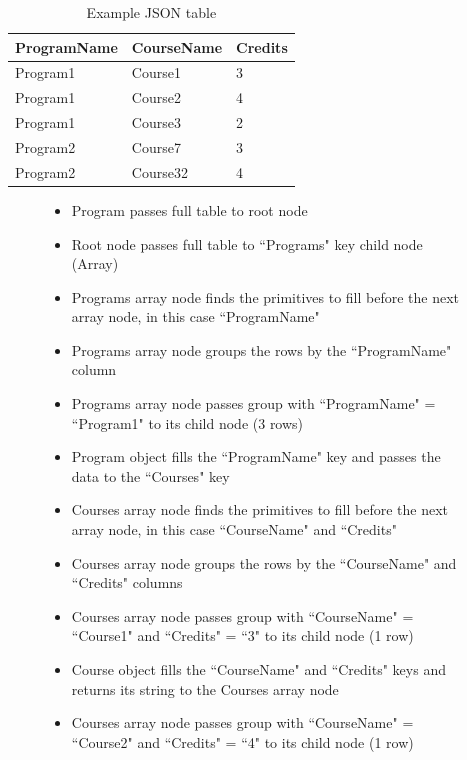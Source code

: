 \begin{table}[]
    \begin{tabular}{|lll|}
    \hline
    ProgramName & CourseName & Credits \\ \hline
    Program1    & Course1    & 3       \\
    Program1    & Course2    & 4       \\
    Program1    & Course3    & 2       \\
    Program2    & Course7    & 3       \\
    Program2    & Course32   & 4       \\ \hline
    \end{tabular}
    \caption{Example JSON table}
    \label{table:json_table}
\end{table}

\begin{figure}[]
    \begin{mdframed}
        \begin{itemize}
            \item Program passes full table to root node
            \item Root node passes full table to ``Programs" key child node (Array)
            \item Programs array node finds the primitives to fill before the next array node, in this case ``ProgramName"
            \item Programs array node groups the rows by the ``ProgramName" column
            \item Programs array node passes group with ``ProgramName" = ``Program1" to its child node (3 rows)
            \item Program object fills the ``ProgramName" key and passes the data to the ``Courses" key
            \item Courses array node finds the primitives to fill before the next array node, in this case ``CourseName" and ``Credits"
            \item Courses array node groups the rows by the ``CourseName" and ``Credits" columns
            \item Courses array node passes group with ``CourseName" = ``Course1" and ``Credits" = ``3" to its child node (1 row)
            \item Course object fills the ``CourseName" and ``Credits" keys and returns its string to the Courses array node
            \item Courses array node passes group with ``CourseName" = ``Course2" and ``Credits" = ``4" to its child node (1 row)

\end{itemize}
\end{mdframed}
\end{figure}
